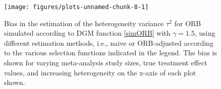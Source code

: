 \documentclass[twocolumn]{article}\usepackage[]{graphicx}\usepackage[]{xcolor}
\makeatletter
\def\maxwidth{ %
  \ifdim\Gin@nat@width>\linewidth
    \linewidth
  \else
    \Gin@nat@width
  \fi
}
\providecommand{\DIFaddbeginFL}{} %
\providecommand{\DIFaddendFL}{} %
\providecommand{\DIFdelbeginFL}{} %
\providecommand{\DIFdelendFL}{} %
\newcommand{\DIFscaledelfig}{0.5}
\newlength{\DIFdelgraphicswidth} %
\newlength{\DIFdelgraphicsheight} %
\newcommand{\DIFaddincludegraphics}[2][]{{\color{blue}\fbox{\DIFOincludegraphics[#1]{#2}}}} %
\newcommand{\DIFdelincludegraphics}[2][]{%
\sbox{\DIFdelgraphicsbox}{\DIFOincludegraphics[#1]{#2}}%
\settoboxwidth{\DIFdelgraphicswidth}{\DIFdelgraphicsbox} %
\settoboxtotalheight{\DIFdelgraphicsheight}{\DIFdelgraphicsbox} %
\scalebox{\DIFscaledelfig}{%
\parbox[b]{\DIFdelgraphicswidth}{\usebox{\DIFdelgraphicsbox}\\[-\baselineskip] \rule{\DIFdelgraphicswidth}{0em}}\llap{\resizebox{\DIFdelgraphicswidth}{\DIFdelgraphicsheight}{%
\setlength{\unitlength}{\DIFdelgraphicswidth}%
\begin{picture}(1,1)%
\thicklines\linethickness{2pt} %
{\color[rgb]{1,0,0}\put(0,0){\framebox(1,1){}}}%
{\color[rgb]{1,0,0}\put(0,0){\line( 1,1){1}}}%
{\color[rgb]{1,0,0}\put(0,1){\line(1,-1){1}}}%
\end{picture}%
}\hspace*{3pt}}} %
} %
\DeclareRobustCommand{\DIFaddbeginFL}{\DIFOaddbeginFL \let\includegraphics\DIFaddincludegraphics} %
\DeclareRobustCommand{\DIFaddendFL}{\DIFOaddendFL \let\includegraphics\DIFOincludegraphics} %
\DeclareRobustCommand{\DIFdelbeginFL}{\DIFOdelbeginFL \let\includegraphics\DIFdelincludegraphics} %
\DeclareRobustCommand{\DIFdelendFL}{\DIFOaddendFL \let\includegraphics\DIFOincludegraphics} %
\makeatother
\begin{document}




\begin{figure}[!hbt]
\centering
\caption{Bias in the estimation of the heterogeneity variance $\tau^2$ for ORB simulated according to DGM function \eqref{simORB} with $\gamma=1.5$, using different estimation methods, i.e., naive or ORB-adjusted according to the various selection functions indicated in the legend. The bias is shown for varying meta-analysis study sizes, true treatment effect values, and increasing heterogeneity on the x-axis of each plot shown.\\[0.5em]}


{\centering \DIFdelbeginFL %
\DIFdelendFL \DIFaddbeginFL \texttt{[image: figures/plots-unnamed-chunk-8-1]} 
\DIFaddendFL 

}



\label{biastau1}
\end{figure}



\end{document}
